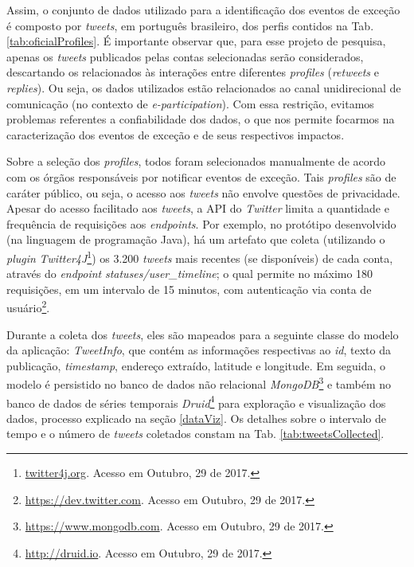 \documentclass[
	12pt,				%
	oneside,			%
	a4paper,			%
	english,			%
	brazil				%
	]{abntex2ppgsi}
\begin{document}
{{Assim, o conjunto de dados utilizado para a identificação dos eventos de exceção é composto por \textit{tweets}, em português brasileiro, dos perfis contidos na Tab. \ref{tab:oficialProfiles}. É importante observar que, para esse projeto de pesquisa, apenas os \textit{tweets} publicados pelas contas selecionadas serão considerados, descartando os relacionados às interações entre diferentes \textit{profiles} (\textit{retweets} e \textit{replies}). Ou seja, os dados utilizados estão relacionados ao canal unidirecional de comunicação (no contexto de \textit{e-participation}). Com essa restrição, evitamos problemas referentes a confiabilidade dos dados, o que nos permite focarmos na caracterização dos eventos de exceção e de seus respectivos impactos.

Sobre a seleção dos \textit{profiles}, todos foram selecionados manualmente de acordo com os órgãos responsáveis por notificar eventos de exceção. Tais \textit{profiles} são de caráter público, ou seja, o acesso aos \textit{tweets} não envolve questões de privacidade.
Apesar do acesso facilitado aos \textit{tweets}, a API do \textit{Twitter} limita a quantidade e frequência de requisições aos \textit{endpoints}. Por exemplo, no protótipo desenvolvido (na linguagem de programação Java), há um artefato que coleta (utilizando o \textit{plugin} \textit{Twitter4J}\footnote{\url{twitter4j.org}. Acesso em Outubro, 29 de 2017.}) os 3.200 \textit{tweets} mais recentes (se disponíveis) de cada conta, através do \textit{endpoint} \textit{statuses/user\_timeline}; o qual permite no máximo 180 requisições, em um intervalo de 15 minutos, com autenticação via conta de usuário\footnote{\url{https://dev.twitter.com}. Acesso em Outubro, 29 de 2017.}.

Durante a coleta dos \textit{tweets}, eles são mapeados para a seguinte classe do modelo da aplicação: \textit{TweetInfo}, que contém as informações respectivas ao \textit{id}, texto da publicação, \textit{timestamp}, endereço extraído, latitude e longitude. Em seguida, o modelo é persistido no banco de dados não relacional \textit{MongoDB}\footnote{\url{https://www.mongodb.com}. Acesso em Outubro, 29 de 2017.} e também no banco de dados de séries temporais \textit{Druid}\footnote{\url{http://druid.io}. Acesso em Outubro, 29 de 2017.} para exploração e visualização dos dados, processo explicado na seção \ref{dataViz}. Os detalhes sobre o intervalo de tempo e o número de \textit{tweets} coletados constam na Tab. \ref{tab:tweetsCollected}.

}}
\end{document}
